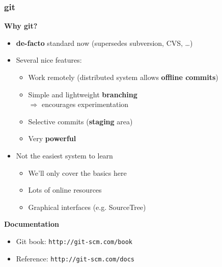 \documentclass{beamer}
\begin{document}

\begin{frame}
  \frametitle{git}
  \textbf{\Large Why git?}
  \begin{itemize}
  \item \textbf{de-facto} standard now (supersedes subversion, CVS, \dots)
  \item Several nice features:
    \begin{itemize}
      \item Work remotely (distributed system allows \textbf{offline commits})
      \item Simple and lightweight \textbf{branching}\\$\Rightarrow$ encourages experimentation
      \item Selective commits (\textbf{staging} area)
      \item Very \textbf{powerful}
    \end{itemize}
  \item Not the easiest system to learn
    \begin{itemize}
      \item We'll only cover the basics here
      \item Lots of online resources
      \item Graphical interfaces (e.g. SourceTree)
    \end{itemize}
  \end{itemize}
  \vspace{2ex}
  \textbf{\Large Documentation}
  \begin{itemize}
  \item Git book: \texttt{http://git-scm.com/book}
  \item Reference: \texttt{http://git-scm.com/docs}
  \end{itemize}
\end{frame}

\end{document}
